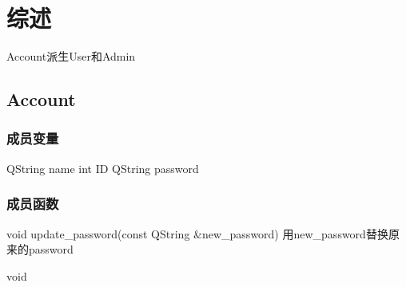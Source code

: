 
\section{综述}
    Account派生User和Admin
    
\subsection{Account}
    \subsubsection{成员变量}
    QString name
    int ID
    QString password

    \subsubsection{成员函数}
    void update_password(const QString &new_password)
    用new_password替换原来的password
    
    void 